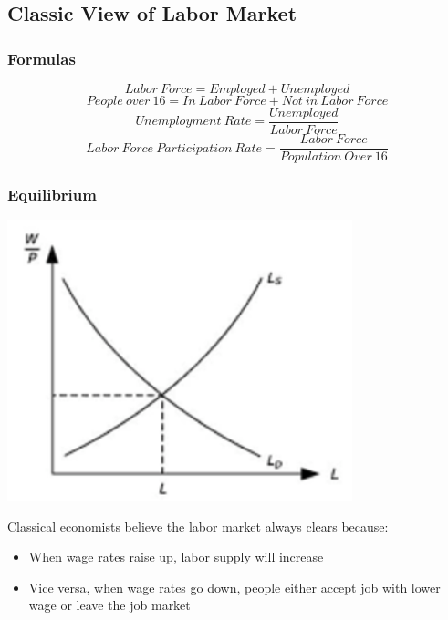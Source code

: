 \documentclass[11pt]{article}
\begin{document}
\subsection{Classic View of Labor Market}
\subsubsection{Formulas}
\begin{equation}
        Labor\ Force = Employed + Unemployed
    \end{equation}
    \begin{equation}
        People\ over\ 16 = In\ Labor\ Force + Not\ in\ Labor\ Force 
    \end{equation}
    \begin{equation}
        Unemployment\ Rate = \frac {Unemployed}{Labor\ Force}
    \end{equation}
    \begin{equation}
        Labor\ Force\ Participation\ Rate = \frac{Labor\ Force}{Population\ Over\ 16}
    \end{equation}
    
    \subsubsection{Equilibrium}
    \includegraphics[width=10cm]{labor.png}
    
    Classical economists believe the labor market always clears because:
    \begin{itemize}
        \item When wage rates raise up, labor supply will increase
        \item Vice versa, when wage rates go down, people either accept job with lower wage or leave the job market

    \end{itemize}
\end{document}

